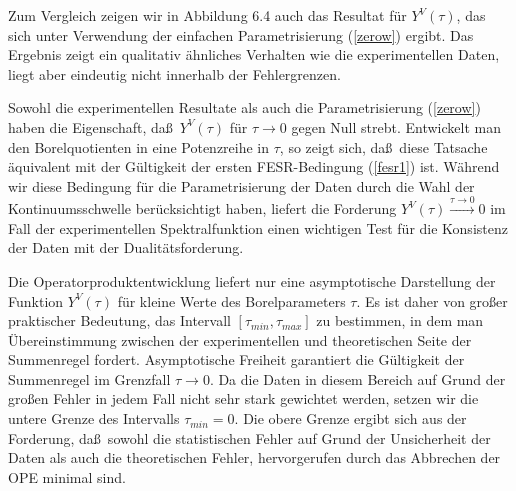 Zum Vergleich zeigen wir in Abbildung 6.4 auch das Resultat f\"ur
$Y^V(\tau)$, das sich unter Verwendung der einfachen Parametrisierung
(\ref{zerow}) ergibt. Das Ergebnis zeigt ein qualitativ \"ahnliches
Verhalten wie die experimentellen Daten, liegt aber eindeutig nicht 
innerhalb der Fehlergrenzen. 

Sowohl die experimentellen Resultate als auch die Parametrisierung 
(\ref{zerow}) haben die Eigenschaft, da\ss\ $Y^V(\tau)$ f\"ur 
$\tau\to 0$ gegen Null strebt. Entwickelt man den Borelquotienten 
in eine Potenzreihe in $\tau$, so zeigt sich, da\ss\ diese Tatsache
\"aquivalent mit der G\"ultigkeit der ersten FESR-Bedingung (\ref{fesr1})
ist. W\"ahrend wir diese Bedingung f\"ur die Parametrisierung der 
Daten durch die Wahl der Kontinuumsschwelle ber\"ucksichtigt haben,
liefert die Forderung $Y^V(\tau)\stackrel{\tau\to 0}{\rightarrow}0$
im Fall der experimentellen Spektralfunktion   einen wichtigen Test
f\"ur die Konsistenz der Daten mit der Dualit\"atsforderung. 

Die Operatorproduktentwicklung liefert nur eine asymptotische 
Darstellung der Funktion $Y^V(\tau)$ f\"ur kleine Werte 
des Borelparameters $\tau$. Es ist daher von gro\ss er 
praktischer Bedeutung, das Intervall $[\tau_{min},\tau_{max}]$
zu bestimmen, in dem man \"Ubereinstimmung zwischen der experimentellen 
und theoretischen Seite der  Summenregel fordert. Asymptotische
Freiheit garantiert die G\"ultigkeit der Summenregel im Grenzfall 
$\tau\to 0$. Da die Daten in diesem Bereich auf Grund der gro\ss en 
Fehler in jedem Fall nicht sehr stark gewichtet werden, setzen wir
die untere Grenze des Intervalls $\tau_{min}=0$. Die obere Grenze
ergibt sich aus der Forderung, da\ss\ sowohl die statistischen
Fehler auf Grund der Unsicherheit der Daten als auch die theoretischen 
Fehler, hervorgerufen durch das Abbrechen der OPE minimal sind.  

